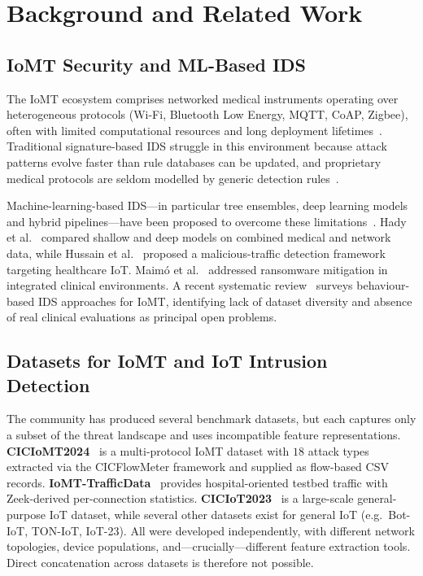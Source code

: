 \documentclass[runningheads]{llncs}
\begin{document}
\section{Background and Related Work}
\label{sec:background}

\subsection{IoMT Security and ML-Based IDS}

The IoMT ecosystem comprises networked medical instruments operating over heterogeneous protocols (Wi-Fi, Bluetooth Low Energy, MQTT, CoAP, Zigbee), often with limited computational resources and long deployment lifetimes~\cite{dimitrov2016medical}. Traditional signature-based IDS struggle in this environment because attack patterns evolve faster than rule databases can be updated, and proprietary medical protocols are seldom modelled by generic detection rules~\cite{khraisat2019survey}.

Machine-learning-based IDS---in particular tree ensembles, deep learning models and hybrid pipelines---have been proposed to overcome these limitations~\cite{ahmad2021network,heidari2023iot}. Hady et al.~\cite{hady2020ids} compared shallow and deep models on combined medical and network data, while Hussain et al.~\cite{hussain2021framework} proposed a malicious-traffic detection framework targeting healthcare IoT. Maim\'{o} et al.~\cite{maimo2019intelligent} addressed ransomware mitigation in integrated clinical environments. A recent systematic review~\cite{domenech2024ensuring} surveys behaviour-based IDS approaches for IoMT, identifying lack of dataset diversity and absence of real clinical evaluations as principal open problems.

\subsection{Datasets for IoMT and IoT Intrusion Detection}

The community has produced several benchmark datasets, but each captures only a subset of the threat landscape and uses incompatible feature representations. \textbf{CICIoMT2024}~\cite{dadkhah2024ciciomt} is a multi-protocol IoMT dataset with $18$ attack types extracted via the CICFlowMeter framework and supplied as flow-based CSV records. \textbf{IoMT-TrafficData}~\cite{areia2024iomt} provides hospital-oriented testbed traffic with Zeek-derived per-connection statistics. \textbf{CICIoT2023}~\cite{neto2023ciciot2023} is a large-scale general-purpose IoT dataset, while several other datasets exist for general IoT (e.g.\ Bot-IoT, TON-IoT, IoT-23). All were developed independently, with different network topologies, device populations, and---crucially---different feature extraction tools. Direct concatenation across datasets is therefore not possible.
\end{document}
